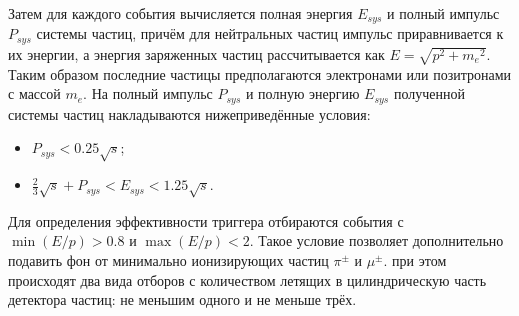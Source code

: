 Затем для каждого события вычисляется полная энергия $E_{sys}$ и полный импульс $P_{sys}$ системы частиц,
причём для нейтральных частиц импульс приравнивается к их энергии, а энергия заряженных частиц рассчитывается как $E = \sqrt{p^2 + {m_e}^2}$.
Таким образом последние частицы предполагаются электронами или позитронами с массой $m_e$.
На полный импульс $P_{sys}$ и полную энергию $E_{sys}$ полученной системы частиц накладываются нижеприведённые условия:
\begin{itemize}
    \item $P_{sys} < 0.25 \sqrt{s}$;
    \item $\frac{2}{3} \sqrt{s} + P_{sys} < E_{sys} < 1.25 \sqrt{s}$.
\end{itemize}
Для определения эффективности триггера отбираются события с $\min (E/p) > 0.8$ и $\max (E/p) < 2$.
Такое условие позволяет дополнительно подавить
фон от минимально ионизирующих частиц $\pi^\pm$ и $\mu^\pm$.
при этом происходят два вида отборов с количеством летящих в цилиндрическую часть детектора частиц:
не меньшим одного и не меньше трёх.


